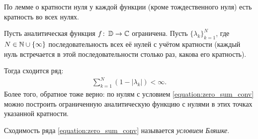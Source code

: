 \documentclass[../../main.tex]{subfiles}
\begin{document}
По лемме о кратности нуля у каждой функции (кроме тождественного нуля) есть кратность во всех нулях.

\begin{thm}
 Пусть аналитическая функция $ f\colon\,\mathbb D \to \mathbb{C} $  ограничена. Пусть $\{\lambda_{k}\}_{k=1}^{N} $,  где $ N \in \mathbb{N} \cup \left\{ \infty \right\} $ последовательность всех её нулей с учётом кратности (каждый нуль встречается в этой последовательности столько раз, какова его кратность).

 Тогда сходится ряд:
 \begin{align}
  \label{equation:zero_sum_conv}
  \sum_{k=1}^{N} \left( 1 - \left| \lambda_k \right| \right) < \infty.
 \end{align} Более того, обратное тоже верно: по нулям с условием \eqref{equation:zero_sum_conv} можно построить ограниченную аналитическую функцию с нулями в этих точках указанной кратности.
\end{thm}
Сходимость ряда \eqref{equation:zero_sum_conv} называется \textit{условием Бляшке}.
\end{document}
